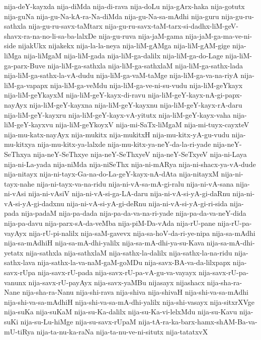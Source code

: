 {nija-deY-kayxda
nija-diMda
nija-di-rava
nija-doLu
nija-gArx-haka
nija-gotutx
nija-guNa
nija-gu-Na-kA-ra-Na-diMda
nija-gu-Na-sa-mAdhi
nija-guru
nija-gu-ru-sathxla
nija-gu-ru-savx-taMtarx
nija-gu-ru-savx-taM-tarx-si-dadhx-liM-geV-shavx-ra-na-no-li-sa-ba-lalxDe
nija-gu-ruva
nija-jaM-gama
nija-jaM-ga-ma-ve-ni-side
nijakUkx
nijakekx
nija-la-la-neya
nija-liM-gAMga
nija-liM-gAM-gige
nija-liMga
nija-liMgaM
nija-liM-gada
nija-liM-ga-dalilx
nija-liM-ga-do-Lage
nija-liM-ga-parx-Buve
nija-liM-ga-sathxla
nija-liM-ga-sathxlaM
nija-liM-ga-sathx-lada
nija-liM-ga-sathx-la-vA-dudu
nija-liM-ga-vaM-taMge
nija-liM-ga-va-na-riyA
nija-liM-ga-vapapx
nija-liM-ga-veMdu
nija-liM-ga-ve-ni-su-vudu
nija-liM-geYkayx
nija-liM-geYkayxM
nija-liM-geY-kayx-di-ravu
nija-liM-geY-kayx-nA-gi-papx-nayAyx
nija-liM-geY-kayxna
nija-liM-geY-kayxnu
nija-liM-geY-kayx-rA-daru
nija-liM-geY-kayxru
nija-liM-geY-kayx-vA-yitutx
nija-liM-geY-kayx-vaha
nija-liM-geY-kayxvu
nija-liM-geYkoyxV
nija-mi-SaTx-liMgaM
nija-mi-tuyx-cayxteV
nija-mu-katx-nayAyx
nija-mukitx
nija-mukitxH
nija-mu-kitx-yA-gu-vudu
nija-mu-kitxya
nija-mu-kitx-ya-lalxde
nija-mu-kitx-ya-neY-da-la-ri-yade
nija-neY-SeThxya
nija-neY-SeThxye
nija-neY-SeThxyeV
nija-neY-SeTxyeV
nija-ni-Laya
nija-ni-La-yada
nija-niMda
nija-niSeThx
nija-ni-mARya
nija-ni-shacx-ya-vA-dude
nija-nitayx
nija-ni-tayx-Ga-na-do-La-geY-kayx-nA-dAta
nija-nitayxM
nija-ni-tayx-nahe
nija-ni-tayx-va-na-ridu
nija-ni-vA-sa-mA-gi-ralu
nija-ni-vA-sana
nija-ni-vAsi
nija-ni-vAsiV
nija-ni-vA-si-ga-LA-daru
nija-ni-vA-si-yA-gi-daRnu
nija-ni-vA-si-yA-gi-dadxnu
nija-ni-vA-si-yA-gi-deRnu
nija-ni-vA-si-yA-gi-ri-sida
nija-pada
nija-padaM
nija-pa-dada
nija-pa-da-va-na-ri-yade
nija-pa-da-va-neY-dida
nija-pa-davu
nija-parx-sA-da-veMba
nija-piM-Da-vAda
nija-rU-pane
nija-rU-pa-vayAyx
nija-rU-pi-nalilx
nija-saM-gavevx
nija-sa-hoV-da-ri-ye-nipa
nija-sa-mAdhi
nija-sa-mAdhiH
nija-sa-mA-dhi-yalilx
nija-sa-mA-dhi-ya-su-Kava
nija-sa-mA-dhi-yetatx
nija-sathxla
nija-sathxlaM
nija-sathx-la-dalilx
nija-sathx-la-na-ridu
nija-sathx-lava
nija-sathx-la-va-naM-gaM-goMDu
nija-savx-BA-va-da-lilxpapx
nija-savx-rUpa
nija-savx-rU-pada
nija-savx-rU-pa-vA-gu-va-vayayx
nija-savx-rU-pa-vanunx
nija-savx-rU-payAyx
nija-savx-yaMBu
nijasayx
nijashacx
nija-sha-ra-Nane
nija-sha-ra-Nanu
nija-shi-rava
nija-shiva
nija-shivaH
nija-shi-va-sa-mAdhi
nija-shi-va-sa-mAdhiH
nija-shi-va-sa-mA-dhi-yalilx
nija-shi-vasayx
nija-sitxrXVge
nija-suKa
nija-suKaM
nija-su-Ka-dalilx
nija-su-Ka-vi-lelxMdu
nija-su-Kavu
nija-suKi
nija-su-Lu-hiMge
nija-su-savx-rUpaM
nija-tA-ra-ka-barx-hamx-shAM-Ba-va-mU-tiRya
nija-ta-nu-ka-raNa
nija-ta-nu-ve-ni-situtx
nija-tatatxvX
}

